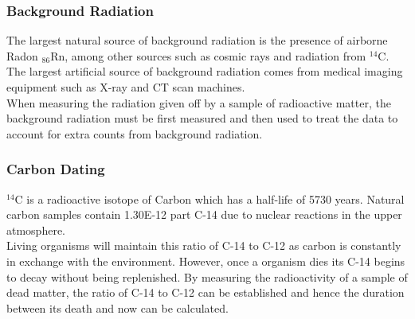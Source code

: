 \documentclass[../main]{subfiles}
\begin{document}





	\subsubsection{Background Radiation}


	The largest natural source of background radiation is the presence of airborne Radon \(_{86}\text{Rn}\), among other sources such as cosmic rays and radiation from \(^{14}\text{C}\). The largest artificial source of background radiation comes from medical imaging equipment such as X-ray and CT scan machines. \\

	When measuring the radiation given off by a sample of radioactive matter, the background radiation must be first measured and then used to treat the data to account for extra counts from background radiation.

	\subsubsection{Carbon Dating}

	\(^{14}\text{C}\) is a radioactive isotope of Carbon which has a half-life of 5730 years. Natural carbon samples contain \SI{1.30E-12}{} part C-14 due to nuclear reactions in the upper atmosphere. \\

	Living organisms will maintain this ratio of C-14 to C-12 as carbon is constantly in exchange with the environment. However, once a organism dies its C-14 begins to decay without being replenished. By measuring the radioactivity of a sample of dead matter, the ratio of C-14 to C-12 can be established and hence the duration between its death and now can be calculated. \\
\end{document}
